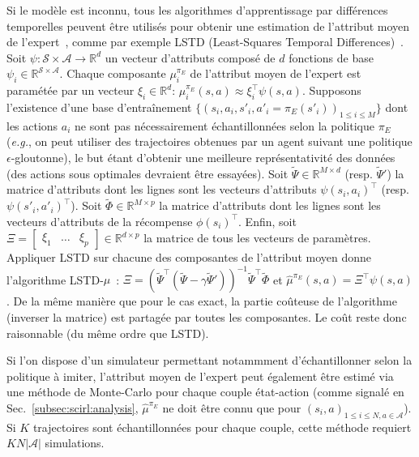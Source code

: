 \documentclass[english,utf8]{./hermes-journal}
\newcommand{\s}{\mathcal{S}}
\newcommand{\A}{\mathcal{A}}
\begin{document}
Si le modèle est inconnu, tous les algorithmes d'apprentissage par différences temporelles peuvent être utilisés pour obtenir une estimation de l'attribut moyen de l'expert~\cite{Klein:2011}, comme par exemple LSTD (Least-Squares Temporal
Differences)~\cite{Bradtke:1996}. Soit $\psi:\s\times \A \rightarrow
\mathbb{R}^d$ un vecteur d'attributs composé de $d$ fonctions de base
$\psi_i \in\mathbb{R}^{\s\times \A}$. Chaque composante $\mu_i^{\pi_E}$
 de l'attribut moyen de l'expert est paramétée par un vecteur
$\xi_i\in\mathbb{R}^d$: $\mu_i^{\pi_E}(s,a)\approx \xi_i^\top
\psi(s,a)$. Supposons l'existence d'une base d'entraînement
$\{(s_i,a_i,s'_i,a'_i=\pi_E(s'_i))_{1\leq i \leq M}\}$ dont les actions 
$a_i$ ne sont pas nécessairement échantillonnées selon la politique $\pi_E$
(\textit{e.g.}, on peut utiliser des trajectoires obtenues par un agent suivant une politique $\epsilon$-gloutonne), le but étant d'obtenir une meilleure représentativité des données (des actions sous optimales devraient être essayées). Soit $\tilde{\Psi}\in \mathbb{R}^{M\times d}$
(resp. $\tilde{\Psi}'$) la matrice d'attributs dont les lignes sont les vecteurs d'attributs $\psi(s_i,a_i)^\top$ (resp. $\psi(s'_i,a'_i)^\top$).
Soit $\tilde{\Phi}\in \mathbb{R}^{M\times p}$ la matrice d'attributs dont les lignes sont les vecteurs d'attributs de la récompense $\phi(s_i)^\top$.
Enfin, soit $\Xi =
\begin{bmatrix}   \xi_1 & \dots & \xi_p
\end{bmatrix}\in\mathbb{R}^{d\times p}$ la matrice de tous les vecteurs de paramètres. Appliquer LSTD sur chacune des composantes de l'attribut moyen donne l'algorithme LSTD-$\mu$~\cite{Klein:2011}: $\Xi =
(\tilde{\Psi}^\top(\tilde{\Psi} - \gamma
\tilde{\Psi}'))^{-1}\tilde{\Psi}^\top \tilde{\Phi}$ et
$\hat{\mu}^{\pi_E}(s,a) = \Xi^\top \psi(s,a)$.
De la même manière que pour le cas exact, la partie coûteuse de l'algorithme (inverser la matrice) est partagée par toutes les composantes. Le coût reste donc raisonnable (du même ordre que LSTD).

%
Si l'on dispose d'un simulateur permettant notammment d'échantillonner selon la politique à imiter, l'attribut moyen de l'expert peut également être estimé via une méthode de Monte-Carlo pour chaque couple état-action (comme signalé en Sec.~\ref{subsec:scirl:analysis}, $\hat{\mu}^{\pi_E}$ ne doit être connu que pour $(s_i,a)_{1\leq i\leq N,a\in\A}$). Si $K$
trajectoires sont échantillonnées pour chaque couple, cette méthode requiert $KN|\A|$ simulations.
\end{document}
